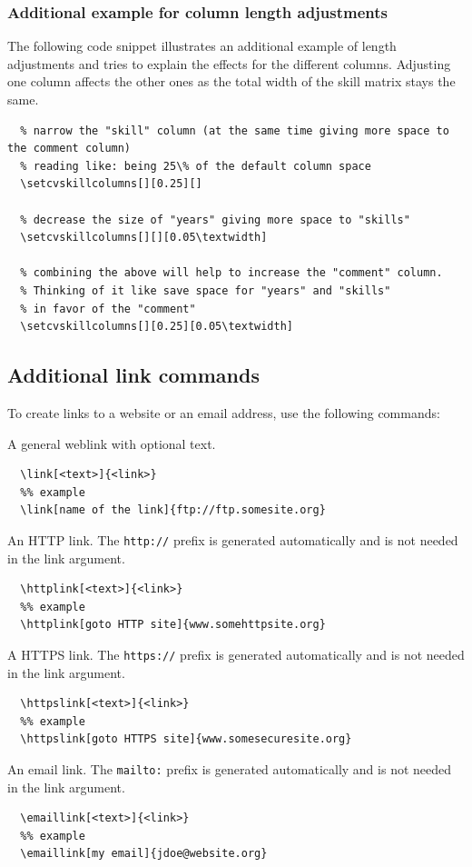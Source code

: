 \documentclass[a4paper, 11pt]{article}
\begin{document}
\subsubsection{Additional example for column length adjustments}
The following code snippet illustrates an additional example of length adjustments and tries to explain the effects for the different columns.
Adjusting one column affects the other ones as the total width of the skill matrix stays the same.
\begin{lstlisting}
  % narrow the "skill" column (at the same time giving more space to the comment column)
  % reading like: being 25\% of the default column space
  \setcvskillcolumns[][0.25][]

  % decrease the size of "years" giving more space to "skills"
  \setcvskillcolumns[][][0.05\textwidth]

  % combining the above will help to increase the "comment" column. 
  % Thinking of it like save space for "years" and "skills"
  % in favor of the "comment"
  \setcvskillcolumns[][0.25][0.05\textwidth]
\end{lstlisting}

\subsection{Additional link commands}%
To create links to a website or an email address, use the following commands:

A general weblink with optional text.
\begin{lstlisting}
  \link[<text>]{<link>}
  %% example
  \link[name of the link]{ftp://ftp.somesite.org}
\end{lstlisting}

An HTTP link. The \texttt{http://} prefix is generated automatically and is not needed in the link argument.
\begin{lstlisting}
  \httplink[<text>]{<link>}
  %% example
  \httplink[goto HTTP site]{www.somehttpsite.org}
\end{lstlisting}

A HTTPS link. The \texttt{https://} prefix is generated automatically and is not needed in the link argument.
\begin{lstlisting}
  \httpslink[<text>]{<link>}
  %% example
  \httpslink[goto HTTPS site]{www.somesecuresite.org}
\end{lstlisting}

An email link. The \texttt{mailto:} prefix is generated automatically and is not needed in the link argument.
\begin{lstlisting}
  \emaillink[<text>]{<link>}
  %% example
  \emaillink[my email]{jdoe@website.org}
\end{lstlisting}
\end{document}
